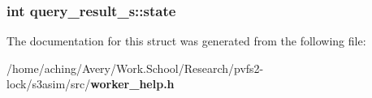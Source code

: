 \subsubsection{\setlength{\rightskip}{0pt plus 5cm}int \bf{query\_\-result\_\-s::state}}\label{structquery__result__s_1ccdb1e90f2c8adaf7ed3dd3613ad2ab}




The documentation for this struct was generated from the following file:\begin{CompactItemize}
\item 
/home/aching/Avery/Work.School/Research/pvfs2-lock/s3asim/src/\bf{worker\_\-help.h}\end{CompactItemize}
